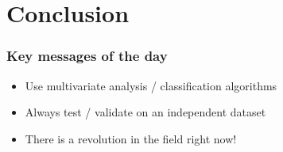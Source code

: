 \section[c/c]{Conclusion}

\begin{frame}
  \frametitle{Key messages of the day}
    \begin{itemize}
    \item Use multivariate analysis / classification algorithms
    \item Always test / validate on an independent dataset
    \item There is a revolution in the field right now!
    \end{itemize}
\end{frame}
